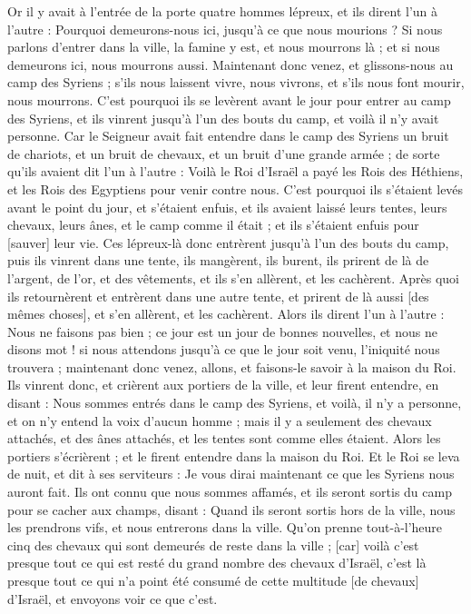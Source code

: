 \begin{multicols}{2}
Or il y avait à l'entrée de la porte quatre hommes lépreux, et ils dirent l'un à l'autre : Pourquoi demeurons-nous ici, jusqu'à ce que nous mourions ?
Si nous parlons d'entrer dans la ville, la famine y est, et nous mourrons là ; et si nous demeurons ici, nous mourrons aussi. Maintenant donc venez, et glissons-nous au camp des Syriens ; s'ils nous laissent vivre, nous vivrons, et s'ils nous font mourir, nous mourrons.
C'est pourquoi ils se levèrent avant le jour pour entrer au camp des Syriens, et ils vinrent jusqu'à l'un des bouts du camp, et voilà il n'y avait personne.
Car le Seigneur avait fait entendre dans le camp des Syriens un bruit de chariots, et un bruit de chevaux, et un bruit d'une grande armée ; de sorte qu'ils avaient dit l'un à l'autre : Voilà le Roi d'Israël a payé les Rois des Héthiens, et les Rois des Egyptiens pour venir contre nous.
C'est pourquoi ils s'étaient levés avant le point du jour, et s'étaient enfuis, et ils avaient laissé leurs tentes, leurs chevaux, leurs ânes, et le camp comme il était ; et ils s'étaient enfuis pour [sauver] leur vie.
Ces lépreux-là donc entrèrent jusqu'à l'un des bouts du camp, puis ils vinrent dans une tente, ils mangèrent, ils burent, ils prirent de là de l'argent, de l'or, et des vêtements, et ils s'en allèrent, et les cachèrent. Après quoi ils retournèrent et entrèrent dans une autre tente, et prirent de là aussi [des mêmes choses], et s'en allèrent, et les cachèrent.
Alors ils dirent l'un à l'autre : Nous ne faisons pas bien ; ce jour est un jour de bonnes nouvelles, et nous ne disons mot ! si nous attendons jusqu'à ce que le jour soit venu, l'iniquité nous trouvera ; maintenant donc venez, allons, et faisons-le savoir à la maison du Roi.
Ils vinrent donc, et crièrent aux portiers de la ville, et leur firent entendre, en disant : Nous sommes entrés dans le camp des Syriens, et voilà, il n'y a personne, et on n'y entend la voix d'aucun homme ; mais il y a seulement des chevaux attachés, et des ânes attachés, et les tentes sont comme elles étaient.
Alors les portiers s'écrièrent ; et le firent entendre dans la maison du Roi.
Et le Roi se leva de nuit, et dit à ses serviteurs : Je vous dirai maintenant ce que les Syriens nous auront fait. Ils ont connu que nous sommes affamés, et ils seront sortis du camp pour se cacher aux champs, disant : Quand ils seront sortis hors de la ville, nous les prendrons vifs, et nous entrerons dans la ville.
Qu'on prenne tout-à-l'heure cinq des chevaux qui sont demeurés de reste dans la ville ; [car] voilà c'est presque tout ce qui est resté du grand nombre des chevaux d'Israël, c'est là presque tout ce qui n'a point été consumé de cette multitude [de chevaux] d'Israël, et envoyons voir ce que c'est.

\end{multicols}
